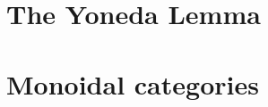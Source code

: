 \section{The Yoneda Lemma}
\label{sec:yoneda}


\section{Monoidal categories}
\label{sec:monoidal-cats}


% 


